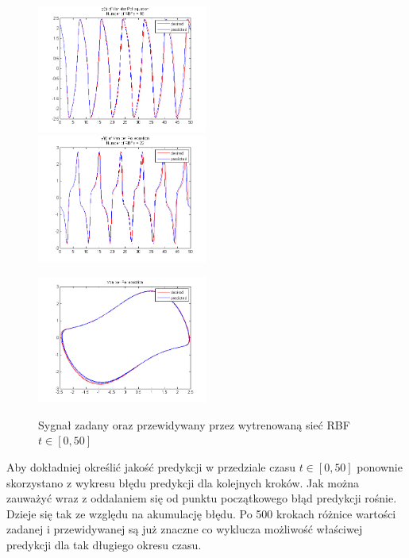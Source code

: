 \begin{figure}[ht!]
	\centering

	\subfloat
	{\includegraphics[width=0.5\textwidth]
	{images/signal_pred400.png}}
	\subfloat
	{\includegraphics[width=0.5\textwidth]
	{images/deriv_pred400.png}}	
	
	\subfloat
	{\includegraphics[width=0.5\textwidth]
	{images/trajectory_pred400.png}}

	\caption{Sygnał zadany oraz przewidywany przez wytrenowaną sieć RBF $t \in [0,50]$}
	\label{img:predicted2}
\end{figure}

Aby dokładniej określić jakość predykcji w przedziale czasu $t \in [0, 50]$ ponownie skorzystano z wykresu błędu predykcji dla kolejnych kroków. Jak można zauważyć wraz z oddalaniem się od punktu początkowego błąd predykcji rośnie. Dzieje się tak ze względu na akumulację błędu. Po 500 krokach różnice wartości zadanej i przewidywanej są już znaczne co wyklucza możliwość właściwej predykcji dla tak długiego okresu czasu.

